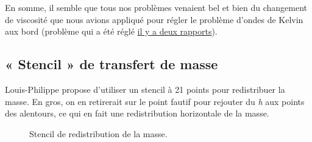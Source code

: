 \documentclass[10pt]{article}
\numberwithin{equation}{section}
\begin{document}
En somme, il semble que tous nos problèmes venaient bel et bien du changement de viscosité que nous avions appliqué pour régler le problème d'ondes de Kelvin aux bord (problème qui a été réglé \href{rapport-2023-10-06.pdf}{il y a deux rapports}).\bigskip



\subsection{« Stencil » de transfert de masse}
\label{sec:orgc289194}
Louis-Philippe propose d'utiliser un stencil à 21 points pour redistribuer la masse.
En gros, on en retirerait sur le point fautif pour rejouter du \emph{h} aux points des alentours, ce qui en fait une redistribution horizontale de la masse.

\begin{figure}[!h]
\centering
{}
\caption{\label{orgab9ca32}Stencil de redistribution de la masse.}
\end{figure}
\end{document}

